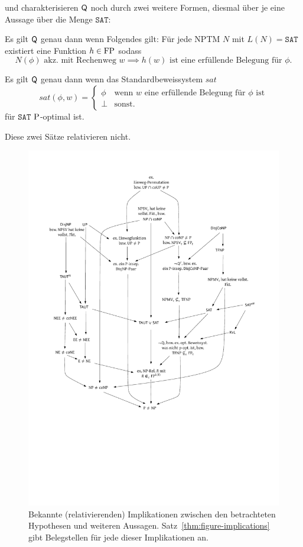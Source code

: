 \textcite{fenner_inverting_2003} und \textcite{kobler_is_2000} charakterisieren $\hQ$ noch durch zwei weitere Formen, diesmal über je eine Aussage über die Menge $\mathtt{SAT}$:

\begin{theorem}\label{thm:q-fenner}
    Es gilt $\hQ$ genau dann wenn Folgendes gilt: Für jede NPTM $N$ mit $L(N)=\mathtt{SAT}$ existiert eine Funktion $h\in \FP$ sodass 
\[ N(\phi) \text{ akz. mit Rechenweg $w$} \implies \text{$h(w)$ ist eine erfüllende Belegung für $\phi$.} \]
\end{theorem}
\begin{theorem}\label{thm:q-messner}
    Es gilt $\hQ$ genau dann wenn das Standardbeweissystem $\mathit{sat}$
            \[ \mathit{sat}(\phi, w) = \begin{cases} \phi & \text{wenn $w$ eine erfüllende Belegung für $\phi$ ist} \\ \bot & \text{sonst.} \end{cases}\]
            für $\mathtt{SAT}$ $\P$-optimal ist.
\end{theorem}
Diese zwei Sätze relativieren nicht.

\begin{figure}[p]
    \includegraphics[page=1]{figures.pdf}
    \caption{Bekannte (relativierenden) Implikationen zwischen den betrachteten Hypothesen und weiteren Aussagen. Satz~\ref{thm:figure-implications} gibt Belegstellen für jede dieser Implikationen an.}\label{fig:figure-implications}
    \forcerectofloat
\end{figure}

